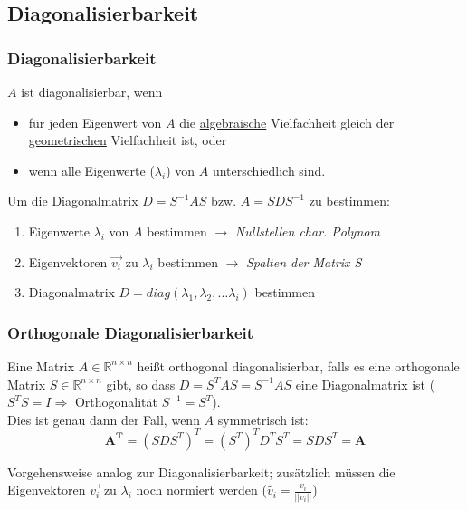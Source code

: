 \subsection{Diagonalisierbarkeit}

\subsubsection{Diagonalisierbarkeit}
\(A\) ist diagonalisierbar, wenn
\begin{itemize}
    \item für jeden Eigenwert von \(A\) die \underline{algebraische} Vielfachheit gleich der \underline{geometrischen} Vielfachheit ist, oder
    \item wenn alle Eigenwerte (\(\lambda_i\)) von \(A\) unterschiedlich sind.
\end{itemize}

Um die Diagonalmatrix \(D = S^{-1}AS\) bzw. \(A=SDS^{-1}\) zu bestimmen:
\begin{enumerate}
    \item Eigenwerte \(\lambda_i\) von \(A\) bestimmen \(\rightarrow\) \textit{Nullstellen char. Polynom}
    \item Eigenvektoren \(\vec{v_i}\) zu \(\lambda_i\) bestimmen \(\rightarrow\) \textit{Spalten der Matrix S}
    \item Diagonalmatrix \(D = diag(\lambda_1, \lambda_2, \hdots \lambda_i)\) bestimmen
\end{enumerate}

\subsubsection{Orthogonale Diagonalisierbarkeit}

Eine Matrix \(A \in \mathbb{R}^{n \times n}\) heißt orthogonal diagonalisierbar, falls es eine orthogonale Matrix \(S \in \mathbb{R}^{n \times n}\) gibt, so dass \(D = S^T A S = S^{-1}AS\) eine Diagonalmatrix ist (\(S^T S = I \Rightarrow \) Orthogonalität \(S^{-1} = S^T\)).\\

Dies ist genau dann der Fall, wenn \(A\) symmetrisch ist:
\begin{equation*}
    \boldsymbol{A^T} = (S D S^T)^T = (S^T)^T D^T S^T = SDS^T = \boldsymbol{A}
\end{equation*}

Vorgehensweise analog zur Diagonalisierbarkeit; zusätzlich müssen die Eigenvektoren \(\vec{v_i}\) zu \(\lambda_i\) noch normiert werden (\(\tilde{v_i}=\frac{v_i}{||v_i||} \))
